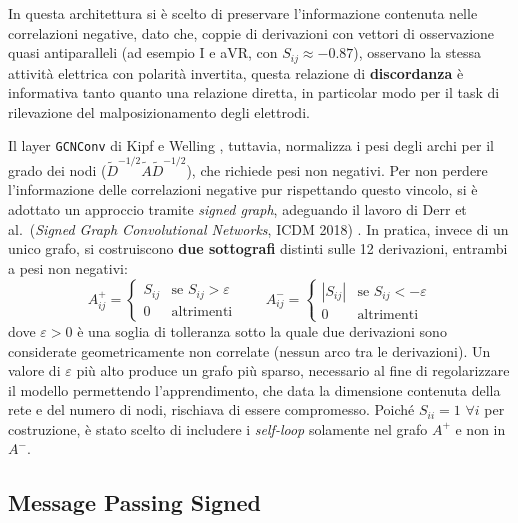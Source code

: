 In questa architettura si è scelto di preservare l'informazione contenuta nelle correlazioni negative, dato che, coppie di derivazioni con vettori di osservazione quasi antiparalleli (ad esempio I e aVR, con $S_{ij}\approx-0.87$), osservano la stessa attività elettrica con polarità invertita, questa relazione di \textbf{discordanza} è informativa tanto quanto una relazione diretta, in particolar modo per il task di rilevazione del malposizionamento degli elettrodi.

Il layer \texttt{GCNConv} di Kipf e Welling \cite{kipfwelling2017}, tuttavia, normalizza i pesi degli archi per il grado dei nodi ($\tilde D^{-1/2}\tilde A\tilde D^{-1/2}$), che richiede pesi non negativi. Per non perdere l'informazione delle correlazioni negative pur rispettando questo vincolo, si è adottato un approccio tramite \emph{signed graph}, adeguando il lavoro di Derr et al.\ (\textit{Signed Graph Convolutional Networks}, ICDM 2018) \cite{derr2018signed}. In pratica, invece di un unico grafo, si costruiscono \textbf{due sottografi} distinti sulle 12 derivazioni, entrambi a pesi non negativi:
\begin{equation}
	A^{+}_{ij} =
	\begin{cases}
		S_{ij} & \text{se } S_{ij} > \varepsilon \\
		0 & \text{altrimenti}
	\end{cases}
	\qquad
	A^{-}_{ij} =
	\begin{cases}
		|S_{ij}| & \text{se } S_{ij} < -\varepsilon \\
		0 & \text{altrimenti}
	\end{cases}
\end{equation}
dove $\varepsilon > 0$ è una soglia di tolleranza sotto la quale due derivazioni sono considerate geometricamente non correlate (nessun arco tra le derivazioni). Un valore di $\varepsilon$ più alto produce un grafo più sparso, necessario al fine di regolarizzare il modello permettendo l'apprendimento,
che data la dimensione contenuta della rete e del numero di nodi, rischiava di essere compromesso. Poiché $S_{ii}=1\,\,\forall i$ per costruzione, è stato scelto di includere i \emph{self-loop} solamente nel grafo $A^+$ e non in $A^-$.

\subsection{Message Passing Signed}
\label{sec:signed_message_passing}

